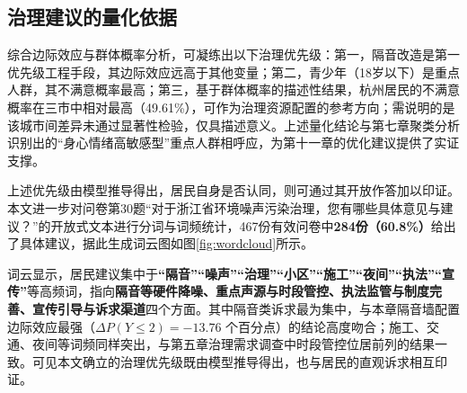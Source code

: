 \subsection{治理建议的量化依据}

综合边际效应与群体概率分析，可凝练出以下治理优先级：第一，隔音改造是第一优先级工程手段，其边际效应远高于其他变量；第二，青少年（18岁以下）是重点人群，其不满意概率最高；第三，基于群体概率的描述性结果，杭州居民的不满意概率在三市中相对最高（49.61\%），可作为治理资源配置的参考方向；需说明的是该城市间差异未通过显著性检验，仅具描述意义。上述量化结论与第七章聚类分析识别出的“身心情绪高敏感型”重点人群相呼应，为第十一章的优化建议提供了实证支撑。

上述优先级由模型推导得出，居民自身是否认同，则可通过其开放作答加以印证。本文进一步对问卷第30题“对于浙江省环境噪声污染治理，您有哪些具体意见与建议？”的开放式文本进行分词与词频统计，467份有效问卷中\textbf{284份（60.8\%）}给出了具体建议，据此生成词云图如图\ref{fig:wordcloud}所示。


词云显示，居民建议集中于\textbf{“隔音”“噪声”“治理”“小区”“施工”“夜间”“执法”“宣传”}等高频词，指向\textbf{隔音等硬件降噪、重点声源与时段管控、执法监管与制度完善、宣传引导与诉求渠道}四个方面。其中隔音类诉求最为集中，与本章隔音墙配置边际效应最强（$\Delta P(Y\le2)=-13.76$ 个百分点）的结论高度吻合；施工、交通、夜间等词频同样突出，与第五章治理需求调查中时段管控位居前列的结果一致。可见本文确立的治理优先级既由模型推导得出，也与居民的直观诉求相互印证。
